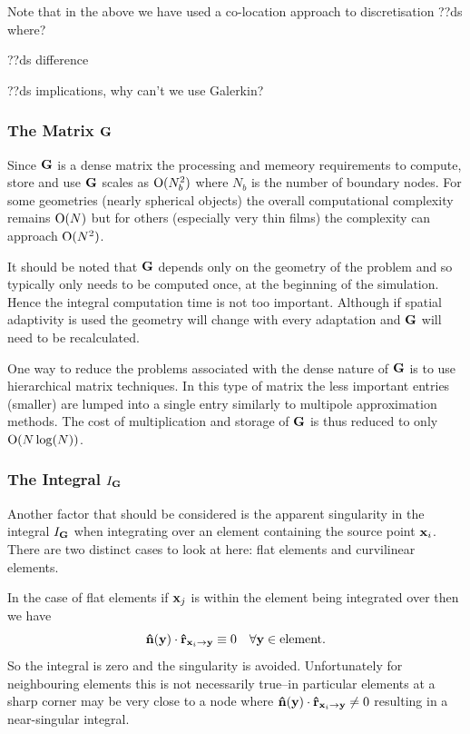 Note that in the above we have used a co-location approach to discretisation
??ds where?

??ds difference

??ds implications, why can't we use Galerkin?

\subsubsection{The Matrix ${\mathbf{G}}$}
Since ${\mathbf{G}}$ is a dense matrix the processing and memeory requirements to compute, store and use ${\mathbf{G}}$ scales as $\text{O}(N_b^2)$ where $N_b$ is the number of boundary nodes. For some geometries (\eg nearly spherical objects) the overall computational complexity remains $\text{O}(N)$ but for others (especially very thin films) the complexity can approach $\text{O}(N^2)$.

It should be noted that ${\mathbf{G}}$ depends only on the geometry of the problem and so typically only needs to be computed once, at the beginning of the simulation. Hence the integral computation time is not too important. Although if spatial adaptivity is used the geometry will change with every adaptation and ${\mathbf{G}}$ will need to be recalculated.

One way to reduce the problems associated with the dense nature of ${\mathbf{G}}$ is to use hierarchical matrix techniques. In this type of matrix the less important entries (\ie smaller) are lumped into a single entry similarly to multipole approximation methods. The cost of multiplication and storage of ${\mathbf{G}}$ is thus reduced to only $\text{O}(N \log(N))$.\cite{Knittel2009}

\subsubsection{The Integral $I_{\mathbf{G}}$}
Another factor that should be considered is the apparent singularity in the integral $I_{\mathbf{G}}$ when integrating over an element containing the source point $\mathbf{x}_{i}$. There are two distinct cases to look at here: flat elements and curvilinear elements.

In the case of flat elements if $\mathbf{x}_{j}$ is within the element being integrated over then we have
\begin{equation}
  \label{eq:7}
  \mathbf{\hat{n}}(\mathbf{y}) \cdot \mathbf{\hat{r}}_{\mathbf{x}_{{i}} \rightarrow \mathbf{y}} \equiv 0 \quad \forall \mathbf{y} \in \text{element}.
\end{equation}
So the integral is zero and the singularity is avoided. Unfortunately for neighbouring elements this is not necessarily true--in particular elements at a sharp corner may be very close to a node where $\mathbf{\hat{n}}(\mathbf{y}) \cdot \mathbf{\hat{r}}_{\mathbf{x}_{{i}} \rightarrow \mathbf{y}} \neq 0$ resulting in a near-singular integral.

